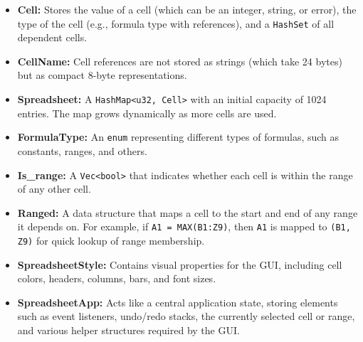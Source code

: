 \documentclass{article}
\begin{document}
\begin{itemize}
    \item \textbf{Cell:} Stores the value of a cell (which can be an integer, string, or error), the type of the cell (e.g., formula type with references), and a \texttt{HashSet} of all dependent cells.
    
    \item \textbf{CellName:} Cell references are not stored as strings (which take 24 bytes) but as compact 8-byte representations.
    
    \item \textbf{Spreadsheet:} A \texttt{HashMap<u32, Cell>} with an initial capacity of 1024 entries. The map grows dynamically as more cells are used.
    
    \item \textbf{FormulaType:} An \texttt{enum} representing different types of formulas, such as constants, ranges, and others.
    
    \item \textbf{Is\_range:} A \texttt{Vec<bool>} that indicates whether each cell is within the range of any other cell.
    
    \item \textbf{Ranged:} A data structure that maps a cell to the start and end of any range it depends on. For example, if \texttt{A1 = MAX(B1:Z9)}, then \texttt{A1} is mapped to \texttt{(B1, Z9)} for quick lookup of range membership.
    
    \item \textbf{SpreadsheetStyle:} Contains visual properties for the GUI, including cell colors, headers, columns, bars, and font sizes.
    
    \item \textbf{SpreadsheetApp:} Acts like a central application state, storing elements such as event listeners, undo/redo stacks, the currently selected cell or range, and various helper structures required by the GUI.
\end{itemize}
\end{document}
